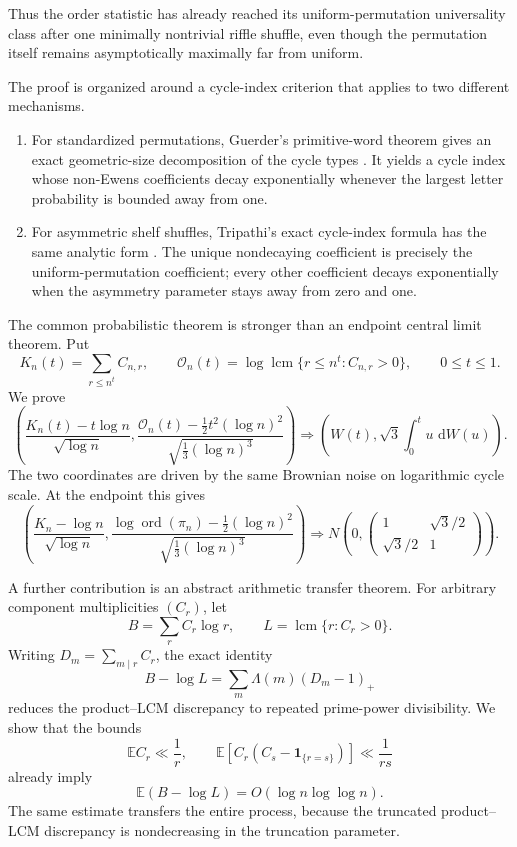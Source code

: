 \documentclass[11pt]{article}
\theoremstyle{definition}
\theoremstyle{remark}
\newcommand{\Ee}{\mathbb E}
\newcommand{\one}{\mathbf 1}
\newcommand{\dd}{\,\mathrm d}
\newcommand{\ord}{\operatorname{ord}}
\newcommand{\lcm}{\operatorname{lcm}}
\newcommand{\cO}{\mathcal O}
\begin{document}
Thus the order statistic has already reached its uniform-permutation
universality class after one minimally nontrivial riffle shuffle, even
though the permutation itself remains asymptotically maximally far from
uniform.

The proof is organized around a cycle-index criterion that applies to two
different mechanisms.

\begin{enumerate}[label=\textnormal{(\roman*)},leftmargin=2.2em]
\item For standardized permutations, Guerder's primitive-word theorem
gives an exact geometric-size decomposition of the cycle types
\cite{Guerder2026}.  It yields a cycle index whose non-Ewens coefficients
decay exponentially whenever the largest letter probability is bounded
away from one.

\item For asymmetric shelf shuffles, Tripathi's exact cycle-index formula
has the same analytic form \cite{Tripathi2026}.  The unique nondecaying
coefficient is precisely the uniform-permutation coefficient; every other
coefficient decays exponentially when the asymmetry parameter stays away
from zero and one.
\end{enumerate}

The common probabilistic theorem is stronger than an endpoint central
limit theorem.  Put
\[
 K_n(t)=\sum_{r\le n^t}C_{n,r},
 \qquad
 \cO_n(t)=\log\lcm\{r\le n^t:C_{n,r}>0\},
 \qquad 0\le t\le1.
\]
We prove
\[
 \left(
 \frac{K_n(t)-t\log n}{\sqrt{\log n}},
 \frac{\cO_n(t)-\frac12t^2(\log n)^2}
      {\sqrt{\frac13(\log n)^3}}
 \right)
 \Rightarrow
 \left(
 W(t),\sqrt3\int_0^t u\,\dd W(u)
 \right).
\]
The two coordinates are driven by the same Brownian noise on logarithmic
cycle scale.  At the endpoint this gives
\[
 \left(
 \frac{K_n-\log n}{\sqrt{\log n}},
 \frac{\log\ord(\pi_n)-\frac12(\log n)^2}
      {\sqrt{\frac13(\log n)^3}}
 \right)
 \Rightarrow
 N\!\left(
 0,
 \begin{pmatrix}
 1&\sqrt3/2\\
 \sqrt3/2&1
 \end{pmatrix}
 \right).
\]

A further contribution is an abstract arithmetic transfer theorem.
For arbitrary component multiplicities $(C_r)$, let
\[
 B=\sum_r C_r\log r,
 \qquad
 L=\lcm\{r:C_r>0\}.
\]
Writing $D_m=\sum_{m\mid r}C_r$, the exact identity
\[
 B-\log L=\sum_m\Lambda(m)(D_m-1)_+
\]
reduces the product--LCM discrepancy to repeated prime-power divisibility.
We show that the bounds
\[
 \Ee C_r\ll\frac1r,
 \qquad
 \Ee\!\left[C_r(C_s-\one_{\{r=s\}})\right]\ll\frac1{rs}
\]
already imply
\[
 \Ee(B-\log L)=O(\log n\log\log n).
\]
The same estimate transfers the entire process, because the truncated
product--LCM discrepancy is nondecreasing in the truncation parameter.
\end{document}
